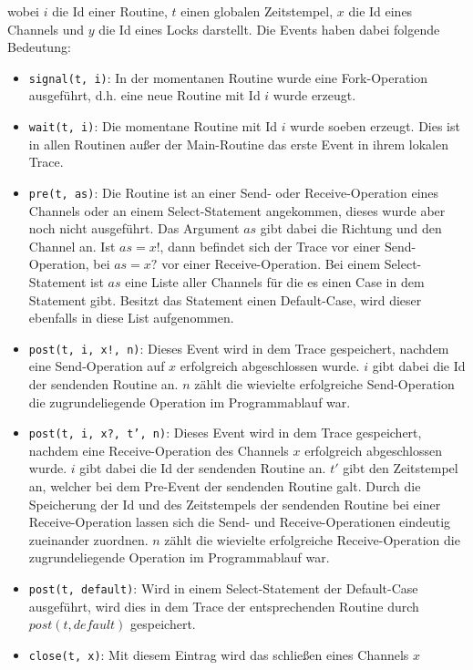 wobei $i$ die Id einer Routine, $t$ einen globalen Zeitstempel, $x$ die Id eines 
Channels und $y$ die Id eines Locks darstellt. Die Events haben dabei folgende Bedeutung:
\begin{itemize}
  \item \texttt{signal(t, i)}: In der momentanen Routine wurde
    eine Fork-Operation ausgeführt,
    d.h. eine neue Routine mit Id $i$ wurde erzeugt.
  \item \texttt{wait(t, i)}: Die momentane Routine mit Id $i$ wurde soeben erzeugt. Dies ist 
    in allen Routinen außer der Main-Routine das erste Event in ihrem lokalen Trace.
  \item \texttt{pre(t, as)}: Die Routine ist an einer Send- oder Receive-Operation eines 
    Channels oder an einem Select-Statement angekommen, dieses wurde aber noch nicht 
    ausgeführt. Das Argument $as$ gibt dabei die Richtung und den Channel an. 
    Ist $as = x!$, dann befindet sich der Trace vor einer Send-Operation, bei 
    $as = x?$ vor einer Receive-Operation. Bei einem Select-Statement ist 
    $as$ eine Liste aller Channels für die es einen 
    Case in dem Statement gibt. Besitzt das Statement einen Default-Case, wird
    dieser ebenfalls in diese List aufgenommen.
  \item \texttt{post(t, i, x!, n)}: Dieses Event wird in dem Trace gespeichert, nachdem 
    eine Send-Operation auf $x$ erfolgreich abgeschlossen wurde. 
    $i$ gibt dabei die Id der sendenden Routine an. $n$ zählt die wievielte 
    erfolgreiche Send-Operation die zugrundeliegende Operation im Programmablauf war.
  \item \texttt{post(t, i, x?, t', n)}: Dieses Event wird in dem Trace gespeichert, nachdem 
    eine Receive-Operation des Channels $x$ erfolgreich abgeschlossen wurde. 
    $i$ gibt dabei die Id der sendenden Routine an. $t'$ gibt den Zeitstempel an,
    welcher bei dem Pre-Event der sendenden Routine galt. Durch die Speicherung der Id und des 
    Zeitstempels der sendenden Routine bei einer Receive-Operation lassen sich 
    die Send- und Receive-Operationen eindeutig zueinander zuordnen. $n$ zählt die wievielte 
    erfolgreiche Receive-Operation die zugrundeliegende Operation im Programmablauf war.
  \item \texttt{post(t, default)}: Wird in einem Select-Statement der Default-Case ausgeführt,
    wird dies in dem Trace der entsprechenden Routine durch $post(t, default)$ 
    gespeichert.
  \item \texttt{close(t, x)}: Mit diesem Eintrag wird das schließen eines Channels $x$ 

\end{itemize}
